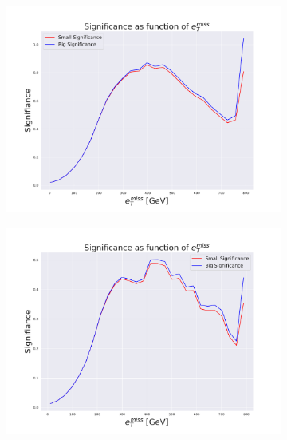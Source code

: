  \begin{figure}[H]
    \centering
    \begin{subfigure}{.45\textwidth}
        \includegraphics[width=\textwidth]{Figures/VAE_testing/big/2lep/significance_etmiss_450p0p0300.pdf}
        \caption{ }
        \label{fig:VAE_2lep_big_450_signi}
    \end{subfigure}
    \hfill
    \begin{subfigure}{.45\textwidth}
        \includegraphics[width=\textwidth]{Figures/VAE_testing/small/2lep/significance_etmiss_450p0p0300.pdf}
        \caption{}
        \label{fig:VAE_2lep_small_450_signi}
    \end{subfigure}
    \hfill
    \begin{subfigure}{.45\textwidth}

\end{subfigure}
\end{figure}

